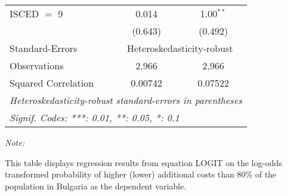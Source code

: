 \begin{table}[htbp!]
\begin{adjustbox}{width = 1\textwidth, max height = 0.95\textheight, center}
\begin{threeparttable}[b]
\begin{tabular}{lcc}
            ISCED $=$ 9          & 0.014       & 1.00$^{**}$\\   
                                 & (0.643)     & (0.492)\\   
            \midrule 
            Standard-Errors & \multicolumn{2}{c}{Heteroskedasticity-robust} \\ 
            Observations         & 2,966       & 2,966\\  
            Squared Correlation  & 0.00742     & 0.07522\\  
            \midrule \midrule
            \multicolumn{3}{l}{\emph{Heteroskedasticity-robust standard-errors in parentheses}}\\
            \multicolumn{3}{l}{\emph{Signif. Codes: ***: 0.01, **: 0.05, *: 0.1}}\\
         \end{tabular}
         
         \begin{tablenotes}\item \medskip \textit{Note:}
            \item This table displays regression results from equation LOGIT on the log-odds transformed probability of higher (lower) additional costs than 80\% of the population in Bulgaria as the dependent variable. 
         \end{tablenotes}
      \end{threeparttable}
   \end{adjustbox}
\end{table}


